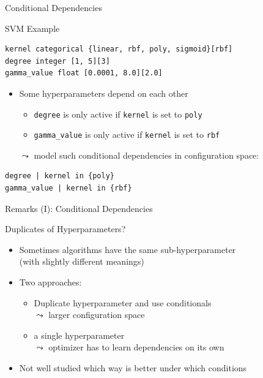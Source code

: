 \begin{frame}[c, fragile]{Conditional Dependencies}

\begin{block}{SVM Example}
\begin{verbatim}
kernel categorical {linear, rbf, poly, sigmoid}[rbf]
degree integer [1, 5][3]
gamma_value float [0.0001, 8.0][2.0]
\end{verbatim}
\end{block}

\begin{itemize}
  \item Some hyperparameters depend on each other
  \begin{itemize}
    \item \texttt{degree} is only active if \texttt{kernel} is set to \texttt{poly}
    \item \texttt{gamma\_value} is only active if \texttt{kernel} is set to \texttt{rbf}  
  \end{itemize}
  \bigskip
  \pause
  \item[$\leadsto$] model such conditional dependencies in configuration space:
\end{itemize}

\begin{verbatim}
degree | kernel in {poly}
gamma_value | kernel in {rbf}
\end{verbatim}

\end{frame}
\begin{frame}[c, fragile]{Remarks (I): Conditional Dependencies}

\begin{block}{Duplicates of Hyperparameters?}
\begin{itemize}
	\item Sometimes algorithms have the same sub-hyperparameter\\ (with slightly different meanings)
	\item Two approaches:
	\begin{itemize}
		\item Duplicate hyperparameter and use conditionals \\
		$\leadsto$ larger configuration space
		\item a single hyperparameter\\
		$\leadsto$ optimizer has to learn dependencies on its own
	\end{itemize}
    \item Not well studied which way is better under which conditions
\end{itemize}
\end{block}
	
\end{frame}
